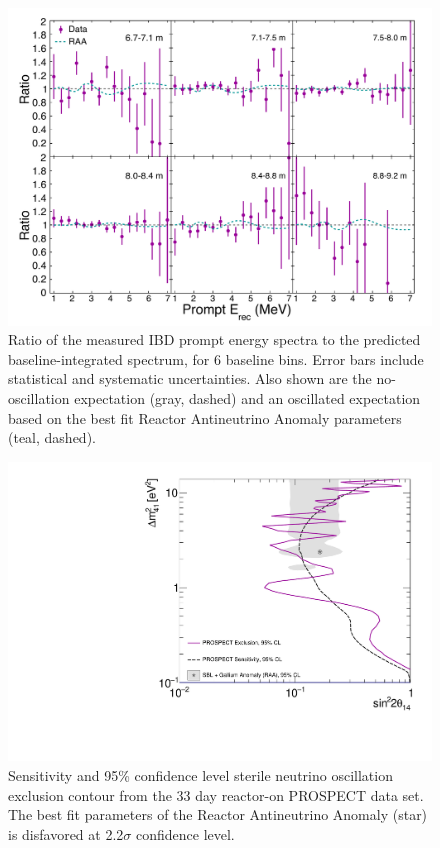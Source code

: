 \begin{figure}[H]
	\centering
	\includegraphics[width=0.9\linewidth]{tex/7-oscillation-images/BaselineSpectra}
	\caption{Ratio of the measured IBD prompt energy spectra to the predicted baseline-integrated spectrum, for 6 baseline bins. Error bars include statistical and systematic uncertainties. Also shown are the no-oscillation expectation (gray, dashed) and an oscillated expectation based on the best fit Reactor Antineutrino Anomaly parameters (teal, dashed). \cite{PhysRevLett.121.251802}}
	\label{fig:baselinespectra}
\end{figure}

\begin{figure}[H]
	\centering
	\includegraphics[width=0.7\linewidth]{tex/7-oscillation-images/Exclusion_Sensitivity_Final}
	\caption[]{Sensitivity and 95\% confidence level sterile neutrino oscillation exclusion contour from the 33 day reactor-on PROSPECT data set. The best fit parameters of the Reactor Antineutrino Anomaly (star) is disfavored at 2.2$\sigma$ confidence level. \cite{PhysRevLett.121.251802}}
	\label{fig:exclusionsensitivityfinal}
\end{figure}




